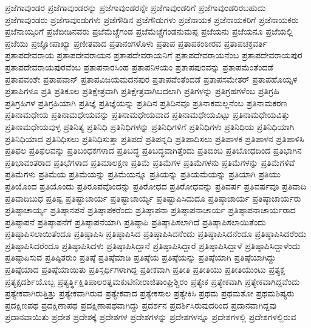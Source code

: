{ಪ್ರಜೆಗಾವುಂಡರ
ಪ್ರಜೆಗಾವುಂಡರನ್ನು
ಪ್ರಜೆಗಾವುಂಡರನ್ನೇ
ಪ್ರಜೆಗಾವುಂಡರಿಗೆ
ಪ್ರಜೆಗಾವುಂಡರಿರಬಹುದು
ಪ್ರಜೆಗಾವುಂಡರು
ಪ್ರಜೆಗಾವುಂಡುಗಳು
ಪ್ರಜೆಗೌಡಿನ
ಪ್ರಜೆಗೌಡುಗಳು
ಪ್ರಜೆನಾಯಕ
ಪ್ರಜೆನಾಯಕರಿಗೆ
ಪ್ರಜೆನಾಯಕರು
ಪ್ರಜೆನಾಯ್ಕರಿಗೆ
ಪ್ರಜೆಬೀಡಿನವರು
ಪ್ರಜೆಮೆಚ್ಚೆಗಂಡ
ಪ್ರಜೆಮೆಚ್ಚೆಗಂಡನುಮಪ್ಪ
ಪ್ರಜೆಯನು
ಪ್ರಜೆಯನೂ
ಪ್ರಜೆಯಲ್ಲಿ
ಪ್ರಜೆಯು
ಪ್ರಜ್ಞೋಪಾಖ್ಯಾ
ಪ್ರಣೀತವಾದ
ಪ್ರತಾನಂಗಳೊಳು
ಪ್ರತಾಪ
ಪ್ರತಾಪಕಂಠೀರವ
ಪ್ರತಾಪಚಕ್ರವರ್ತಿ
ಪ್ರತಾಪದೇವರಾಯ
ಪ್ರತಾಪದೇವರಾಯನ
ಪ್ರತಾಪದೇವರಾಯನಿಗೆ
ಪ್ರತಾಪದೇವರಾಯನೆಂಬ
ಪ್ರತಾಪದೇವರಾಯಪುರ
ಪ್ರತಾಪದೇವರಾಯಪುರವೆಂಬ
ಪ್ರತಾಪನಾರಸಿಂಹ
ಪ್ರತಾಪನಿಳಯಂ
ಪ್ರತಾಪಪುರವನ್ನು
ಪ್ರತಾಪಮೆಂತೆಂದಡೆ
ಪ್ರತಾಪವಂಶೇ
ಪ್ರತಾಪವಾನ್
ಪ್ರತಾಪವಿಜಯಮದನಪುರ
ಪ್ರತಾಪವೆಂತೆಂದಡೆ
ಪ್ರತಾಪಸಮೇತರ್
ಪ್ರತಾಪಹೊಯ್ಸಳ
ಪ್ರತಾಪಿಗಳೂ
ಪ್ರತಿ
ಪ್ರತಿಕೂಲ
ಪ್ರತಿಕ್ಷೇತ್ರವಾಗಿ
ಪ್ರತಿಕ್ಷೇತ್ರವಾಗಿಬದಲಾಗಿ
ಪ್ರತಿಗಳನ್ನು
ಪ್ರತಿಗ್ರಹಗಳೆಂಬ
ಪ್ರತಿಗ್ರಹಿ
ಪ್ರತಿಗ್ರಹಿಗಳ
ಪ್ರತಿಗ್ರಹಿಯಾಗಿ
ಪ್ರತಿಜ್ಞೆ
ಪ್ರತಿಜ್ಞೆಯನ್ನು
ಪ್ರತಿದಿನ
ಪ್ರತಿದಿನವೂ
ಪ್ರತಿನಾಕಮಲ್ಲನೆಂಬ
ಪ್ರತಿನಾಮಕರಣ
ಪ್ರತಿನಾಮಧೇಯ
ಪ್ರತಿನಾಮಧೇಯವನ್ನು
ಪ್ರತಿನಾಮಧೇಯವಾದ
ಪ್ರತಿನಾಮಧೇಯವಿಟ್ಟು
ಪ್ರತಿನಾಮಧೇಯವಿತ್ತು
ಪ್ರತಿನಾಮಧೇಯವುಳ್ಳ
ಪ್ರತಿನಿತ್ಯ
ಪ್ರತಿನಿಧಿ
ಪ್ರತಿನಿಧಿಗಳನ್ನು
ಪ್ರತಿನಿಧಿಗಳಿಗೆ
ಪ್ರತಿನಿಧಿಗಳು
ಪ್ರತಿನಿಧಿಯ
ಪ್ರತಿನಿಧಿಯಾಗಿ
ಪ್ರತಿನಿಧಿಯಾದ
ಪ್ರತಿನಿಧಿಸಲು
ಪ್ರತಿನಿಧಿಸುತ್ತಾ
ಪ್ರತಿಪದೆ
ಪ್ರತಿಪನ್ನದಿ
ಪ್ರತಿಪಾದಿಸಲು
ಪ್ರತಿಪಾಳಕ
ಪ್ರತಿಪಾಳನ
ಪ್ರತಿಪಾಳಿಸಿ
ಪ್ರತಿಫಲ
ಪ್ರತಿಫಲವನ್ನು
ಪ್ರತಿಬಂಧಕಗಳಾದ
ಪ್ರತಿಬದ್ಧ
ಪ್ರತಿಬದ್ಧವಾಗಿತ್ತೆಂದು
ಪ್ರತಿಬಿಂಬ
ಪ್ರತಿಬೋಧದಿಂದ
ಪ್ರತಿಭಾಗಿನ
ಪ್ರತಿಭಾವಂತರಾದ
ಪ್ರತಿಭೆಗಳಾದ
ಪ್ರತಿಮಾಲಕ್ಷಣ
ಪ್ರತಿಮೆ
ಪ್ರತಿಮೆಗಳ
ಪ್ರತಿಮೆಗಳನು
ಪ್ರತಿಮೆಗಳನ್ನು
ಪ್ರತಿಮೆಗಳಿವೆ
ಪ್ರತಿಮೆಗಳು
ಪ್ರತಿಮೆಯ
ಪ್ರತಿಮೆಯನ್ನು
ಪ್ರತಿಮೆಯನ್ನೂ
ಪ್ರತಿಯನ್ನು
ಪ್ರತಿಯಮೆಯನ್ನು
ಪ್ರತಿಯಾಗಿ
ಪ್ರತಿಯು
ಪ್ರತಿಯೊಂದ
ಪ್ರತಿಯೊಂದು
ಪ್ರತಿರೂಪವೊಂದನ್ನು
ಪ್ರತಿರೋಧದ
ಪ್ರತಿರೋಧವನ್ನು
ಪ್ರತಿವರ್ಷ
ಪ್ರತಿವರ್ಷವೂ
ಪ್ರತಿವಾದಿ
ಪ್ರತಿವಾದಿಬುಧ
ಪ್ರತಿಷ್ಟ
ಪ್ರತಿಷ್ಟಾಚಾರ್ಯ
ಪ್ರತಿಷ್ಟಾಚಾರ್ಯ್ಯ
ಪ್ರತಿಷ್ಟಾಪಿಸಿದುದೂ
ಪ್ರತಿಷ್ಠಾಚಾರ್ಯ
ಪ್ರತಿಷ್ಠಾಚಾರ್ಯರು
ಪ್ರತಿಷ್ಠಾಚಾರ್ಯ್ಯ
ಪ್ರತಿಷ್ಠಾನಪನೆ
ಪ್ರತಿಷ್ಠಾಪಕರೆಂದು
ಪ್ರತಿಷ್ಠಾಪನಾ
ಪ್ರತಿಷ್ಠಾಪನಾಚಾರ್ಯ
ಪ್ರತಿಷ್ಠಾಪನಾಚಾರ್ಯರಾದ
ಪ್ರತಿಷ್ಠಾಪನೆ
ಪ್ರತಿಷ್ಠಾಪನೆಗೆ
ಪ್ರತಿಷ್ಠಾಪನೆಯಾಗಿ
ಪ್ರತಿಷ್ಠಾಪಿ
ಪ್ರತಿಷ್ಠಾಪಿಸಲಾಗಿದೆ
ಪ್ರತಿಷ್ಠಾಪಿಸಲಾಯಿತೆಂದು
ಪ್ರತಿಷ್ಠಾಪಿಸಲಾಯಿತೆಂದೂ
ಪ್ರತಿಷ್ಠಾಪಿಸಿ
ಪ್ರತಿಷ್ಠಾಪಿಸಿದ
ಪ್ರತಿಷ್ಠಾಪಿಸಿದನೆಂದು
ಪ್ರತಿಷ್ಠಾಪಿಸಿದನೆಂದೂ
ಪ್ರತಿಷ್ಠಾಪಿಸಿದರೆಂದು
ಪ್ರತಿಷ್ಠಾಪಿಸಿದರೆಂದೂ
ಪ್ರತಿಷ್ಠಾಪಿಸಿದಳು
ಪ್ರತಿಷ್ಠಾಪಿಸಿದ್ದಾನೆ
ಪ್ರತಿಷ್ಠಾಪಿಸಿದ್ದಾರೆ
ಪ್ರತಿಷ್ಠಾಪಿಸಿದ್ದಾಳೆ
ಪ್ರತಿಷ್ಠಾಪಿಸಿದ್ದಾಳೆಂದು
ಪ್ರತಿಷ್ಠಾಪಿಸುವ
ಪ್ರತಿಷ್ಠಿತರುಂ
ಪ್ರತಿಷ್ಠೆ
ಪ್ರತಿಷ್ಠೆಮಾಡಿ
ಪ್ರತಿಷ್ಠೆಯ
ಪ್ರತಿಷ್ಠೆಯನ್ನು
ಪ್ರತಿಷ್ಠೆಯಾಗಿ
ಪ್ರತಿಷ್ಠೆಯಾಗಿದ್ದು
ಪ್ರತಿಷ್ಠೆಯಾದ
ಪ್ರತಿಷ್ಠೆಯಾಯಿತು
ಪ್ರತಿಸ್ಪರ್ಧಿಗಳಾಗಿದ್ದ
ಪ್ರತೀಕವಾಗಿ
ಪ್ರತೀತಿ
ಪ್ರತೀತಿಯು
ಪ್ರತೀತಿಯುಂಟು
ಪ್ರತ್ಯಕ್ಷ
ಪ್ರತ್ಯಕ್ಷದರ್ಶಿಯೊಬ್ಬ
ಪ್ರತ್ಯರ್ತ್ಥಿಕ್ಷಿತಿಪಾಲರತ್ನಮಕುಟೀನೀರಾಜಿತಾಂಘ್ರಿಶ್ಚಿರಂ
ಪ್ರತ್ಯೇಕ
ಪ್ರತ್ಯೇಕವಾಗಿ
ಪ್ರತ್ಯೇಕವಾಗಿದ್ದವೆಂದು
ಪ್ರತ್ಯೇಕವಾಗಿರುತ್ತಿತ್ತು
ಪ್ರತ್ಯೇಕವಾಗಿರುವ
ಪ್ರತ್ಯೇಕವಾದ
ಪ್ರತ್ಯೇಕಸಾಲ
ಪ್ರತ್ಯೇಕಿಸಿ
ಪ್ರಥಮ
ಪ್ರಥಮತೋ
ಪ್ರಥಮಶಿಷ್ಯರು
ಪ್ರದಕ್ಷಿಣಪಥ
ಪ್ರದಕ್ಷಿಣಾಪಥ
ಪ್ರದಕ್ಷಿಣಾಪಥವಾಗಿದ್ದು
ಪ್ರದರ್ಶನ
ಪ್ರದರ್ಶಿಸಿರುವುದರಿಂದ
ಪ್ರದಾನವಾಗಿದ್ದವು
ಪ್ರದಾನವಾಯಿತು
ಪ್ರದೇಶ
ಪ್ರದೇಶಕ್ಕೆ
ಪ್ರದೇಶಗಳ
ಪ್ರದೇಶಗಳನ್ನು
ಪ್ರದೇಶಗಳನ್ನೂ
ಪ್ರದೇಶಗಳಲ್ಲಿ
ಪ್ರದೇಶಗಳಲ್ಲಿರುವ
}
